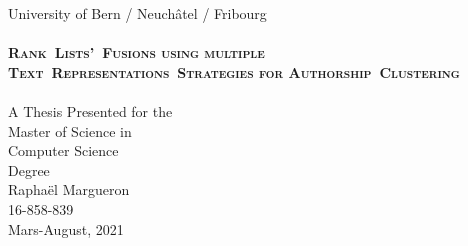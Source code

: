 \begin{titlepage}
  \vspace*{\fill}
  \begin{center}
    {\Large University of Bern / Neuchâtel / Fribourg}
    \\[3.0cm]
    \makebox[\linewidth]{\rule{0.8\paperwidth}{0.4pt}}
    \\[0.9cm]
    {\huge \bfseries \scshape Rank~Lists'~Fusions using multiple Text~Representations~Strategies for Authorship~Clustering}
    \\[0.5cm]
    \makebox[\linewidth]{\rule{0.8\paperwidth}{0.4pt}}
    \\[1.0cm]
    {\large A Thesis Presented for the \\ Master of Science in \\ Computer Science \\ Degree}
    \\[3.5cm]
    {\Large Raphaël Margueron}
    \\
    {\large 16-858-839}
    \\[0.8cm]
    {\large Mars-August, 2021}
    \\[5.0cm]
  \end{center}
  \vspace*{\fill}
\end{titlepage}
